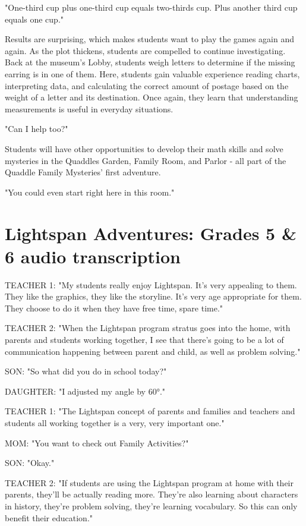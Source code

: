 "One-third cup plus one-third cup equals two-thirds cup.
Plus another third cup equals one cup."

Results are surprising, which makes students want to play the games again and again.
As the plot thickens, students are compelled to continue investigating.
Back at the museum's Lobby, students weigh letters to determine if the missing earring is in one of them.
Here, students gain valuable experience reading charts, interpreting data, and calculating the correct amount of postage based on the weight of a letter and its destination.
Once again, they learn that understanding measurements is useful in everyday situations.

"Can I help too?"

Students will have other opportunities to develop their math skills and solve mysteries in the Quaddles Garden, Family Room, and Parlor - all part of the Quaddle Family Mysteries' first adventure.

"You could even start right here in this room."

\section{Lightspan Adventures: Grades 5 \& 6 audio transcription}

TEACHER 1: "My students really enjoy Lightspan.
It's very appealing to them.
They like the graphics, they like the storyline.
It's very age appropriate for them.
They choose to do it when they have free time, spare time."

TEACHER 2: "When the Lightspan program stratus goes into the home, with parents and students working together, I see that there's going to be a lot of communication happening between parent and child, as well as problem solving."

SON: "So what did you do in school today?"

DAUGHTER: "I adjusted my angle by 60°."

TEACHER 1: "The Lightspan concept of parents and families and teachers and students all working together is a very, very important one."

MOM: "You want to check out Family Activities?"

SON: "Okay."

TEACHER 2: "If students are using the Lightspan program at home with their parents, they'll be actually reading more.
They're also learning about characters in history, they're problem solving, they're learning vocabulary.
So this can only benefit their education."

